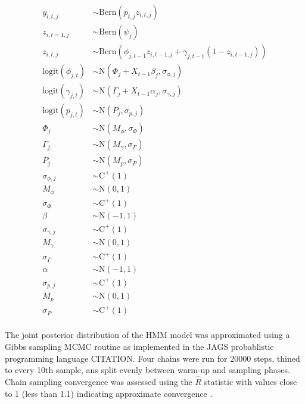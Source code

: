 \documentclass[12pt,letterpaper]{article}
\begin{document}
\begin{equation}
  \begin{aligned}
    y_{i, t, j} &\sim \mathrm{Bern}(p_{t, j} z_{i, t, j}) \\
    z_{i, t = 1, j} &\sim \mathrm{Bern}(\psi_{j}) \\
    z_{i, t, j} &\sim \mathrm{Bern}(\phi_{j, t - 1} z_{i, t - 1, j} + \gamma_{j, t - 1} (1 - z_{i, t - 1, j})) \\
    \mathrm{logit}(\phi_{j, t}) &\sim \mathrm{N}(\Phi_{j} + X_{t - 1}\beta_{j}, \sigma_{\phi, j}) \\
    \mathrm{logit}(\gamma_{j, t}) &\sim \mathrm{N}(\Gamma_{j} + X_{t - 1}\alpha_{j}, \sigma_{\gamma, j}) \\
    \mathrm{logit}(p_{j, t}) &\sim \mathrm{N}(P_{j}, \sigma_{p, j}) \\
    \Phi_{j} &\sim \mathrm{N}(M_{\phi}, \sigma_{\Phi}) \\
    \Gamma_{j} &\sim \mathrm{N}(M_{\gamma}, \sigma_{\Gamma}) \\
    P_{j} &\sim \mathrm{N}(M_{p}, \sigma_{P}) \\
    \sigma_{\phi, j} &\sim \mathrm{C}^{+}(1) \\
    M_{\phi} &\sim \mathrm{N}(0, 1) \\
    \sigma_{\Phi} &\sim \mathrm{C}^{+}(1) \\
    \beta &\sim \mathrm{N}(-1, 1) \\
    \sigma_{\gamma, j} &\sim \mathrm{C}^{+}(1) \\
    M_{\gamma} &\sim \mathrm{N}(0, 1) \\
    \sigma_{\Gamma} &\sim \mathrm{C}^{+}(1) \\
    \alpha &\sim \mathrm{N}(-1, 1) \\
    \sigma_{p, j} &\sim \mathrm{C}^{+}(1) \\
    M_{p} &\sim \mathrm{N}(0, 1) \\
    \sigma_{P} &\sim \mathrm{C}^{+}(1) \\
  \end{aligned}
\end{equation}


The joint posterior distribution of the HMM model was approximated using a Gibbs sampling MCMC routine as implemented in the JAGS probablistic programming language CITATION. Four chains were run for 20000 steps, thined to every 10th sample, ans split evenly between warm-up and sampling phases. Chain sampling convergence was assessed using the \(\hat{R}\) statistic with values close to 1 (less than 1.1) indicating approximate convergence \citep{Gelman2013d}.
\end{document}
